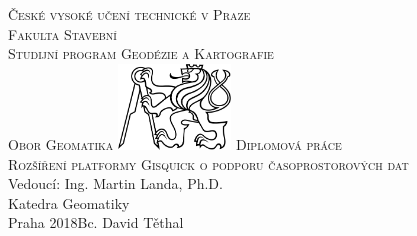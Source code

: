 \begin{center}
\newcommand{\napisCVUT}{České vysoké učení technické v Praze}
\newcommand{\napisFS}{Fakulta Stavební}
\newcommand{\napisProgram}{Studijní program Geodézie a Kartografie}
\newcommand{\napisObor}{Obor Geomatika}
\newcommand{\napisKatedra}{Katedra Geomatiky}
\newcommand{\napisVedouci}{Vedoucí: Ing. Martin Landa, Ph.D.}
\newcommand{\napisAutor}{Bc. David Těthal}
\newcommand{\napisDatum}{Praha 2018}
\newcommand{\napisNazevI}{Rozšíření platformy Gisquick o podporu časoprostorových dat}
\newcommand{\napisDiplomka}{Diplomová práce}
%
\newcommand{\velka}[1]{\textsc{#1}}
%
% 
\newif\ifpatitul
\patitultrue


{\Large\velka{\napisCVUT}}\\
{\Large\velka{\napisFS}}\\
{\Large\velka{\napisProgram}}\\
{\Large\velka{\napisObor}}
\vfill
\includegraphics[width=3cm]{../img/logo_cvut_cb} %
\vfill
{\Large\velka{\napisDiplomka}}\\
\Large\velka{\napisNazevI}\\
\vfill
{\large%
\napisVedouci\\
\napisKatedra\\
\bigskip
\napisDatum\hfill\napisAutor}
\end{center}
